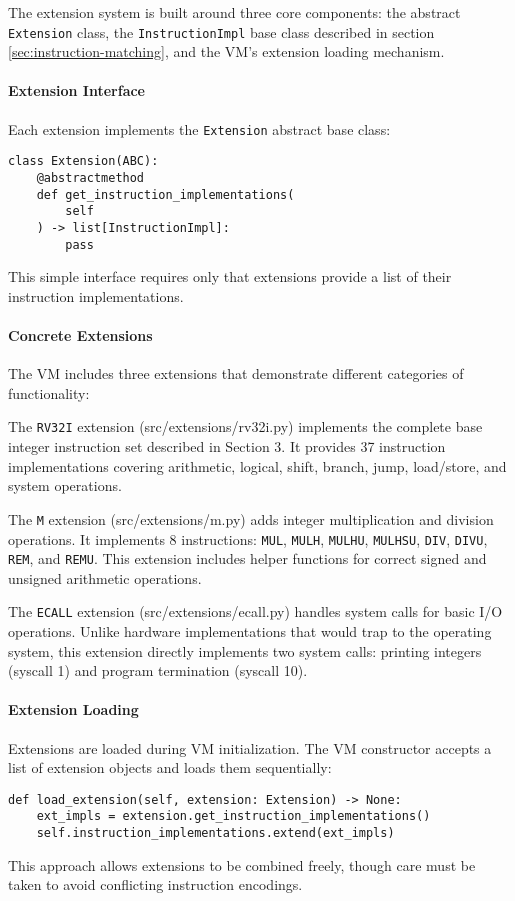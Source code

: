 \documentclass[sigconf]{acmart}
\begin{document}
The extension system is built around three core components: the abstract \texttt{Extension} class, the \texttt{InstructionImpl} base class described in section \ref{sec:instruction-matching}, and the VM's extension loading mechanism.

\paragraph{Extension Interface}
Each extension implements the \texttt{Extension} abstract base class:
\begin{verbatim}
class Extension(ABC):
    @abstractmethod
    def get_instruction_implementations(
        self
    ) -> list[InstructionImpl]:
        pass
\end{verbatim}
This simple interface requires only that extensions provide a list of their instruction implementations.

\paragraph{Concrete Extensions}
The VM includes three extensions that demonstrate different categories of functionality:

The \texttt{RV32I} extension (src/extensions/rv32i.py) implements the complete base integer instruction set described in Section 3. It provides 37 instruction implementations covering arithmetic, logical, shift, branch, jump, load/store, and system operations.

The \texttt{M} extension (src/extensions/m.py) adds integer multiplication and division operations. It implements 8 instructions: \texttt{MUL}, \texttt{MULH}, \texttt{MULHU}, \texttt{MULHSU}, \texttt{DIV}, \texttt{DIVU}, \texttt{REM}, and \texttt{REMU}. This extension includes helper functions for correct signed and unsigned arithmetic operations.

The \texttt{ECALL} extension (src/extensions/ecall.py) handles system calls for basic I/O operations. Unlike hardware implementations that would trap to the operating system, this extension directly implements two system calls: printing integers (syscall 1) and program termination (syscall 10).

\paragraph{Extension Loading}
Extensions are loaded during VM initialization. The VM constructor accepts a list of extension objects and loads them sequentially:
\begin{verbatim}
def load_extension(self, extension: Extension) -> None:
    ext_impls = extension.get_instruction_implementations()
    self.instruction_implementations.extend(ext_impls)
\end{verbatim}
This approach allows extensions to be combined freely, though care must be taken to avoid conflicting instruction encodings.
\end{document}
